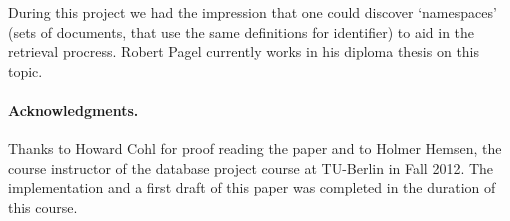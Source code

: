 \documentclass[runningheads]{llncs}
\begin{document}
During this project we had the impression that one could discover `namespaces'
(sets of documents, that use the same definitions for identifier) to aid in
the retrieval procress. Robert Pagel currently works in his diploma thesis on
this topic.


\paragraph*{Acknowledgments.}

Thanks to Howard Cohl for proof reading the paper and to Holmer Hemsen, the
course instructor of the database project course at TU-Berlin in Fall 2012.
The implementation and a first draft of this paper was completed in the
duration of this course.


\begingroup
\let\clearpage\relax

\endgroup
\end{document}
